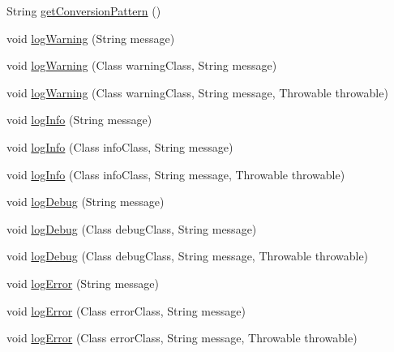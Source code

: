 \begin{DoxyCompactItemize}
\item 
String \mbox{\hyperlink{interfacecom_1_1dlinkddns_1_1atulsaurabh_1_1erpecosystem_1_1logger_1_1_logger_ab9bd1ad5fb48fa4e46fb67fbbe2475f7}{get\+Conversion\+Pattern}} ()
\item 
void \mbox{\hyperlink{interfacecom_1_1dlinkddns_1_1atulsaurabh_1_1erpecosystem_1_1logger_1_1_logger_aab8d04f52fde89ff5e58d84b40e25144}{log\+Warning}} (String message)
\item 
void \mbox{\hyperlink{interfacecom_1_1dlinkddns_1_1atulsaurabh_1_1erpecosystem_1_1logger_1_1_logger_aa5df260afe6fcae92f5a9236b3b6a983}{log\+Warning}} (Class warning\+Class, String message)
\item 
void \mbox{\hyperlink{interfacecom_1_1dlinkddns_1_1atulsaurabh_1_1erpecosystem_1_1logger_1_1_logger_a05aa52bed792e7a4a3519dadaab2f4f3}{log\+Warning}} (Class warning\+Class, String message, Throwable throwable)
\item 
void \mbox{\hyperlink{interfacecom_1_1dlinkddns_1_1atulsaurabh_1_1erpecosystem_1_1logger_1_1_logger_a8671e0fd90d8f2fbb4024d7a73d9070d}{log\+Info}} (String message)
\item 
void \mbox{\hyperlink{interfacecom_1_1dlinkddns_1_1atulsaurabh_1_1erpecosystem_1_1logger_1_1_logger_a37e8723a5243a845e140d2edb6d7f701}{log\+Info}} (Class info\+Class, String message)
\item 
void \mbox{\hyperlink{interfacecom_1_1dlinkddns_1_1atulsaurabh_1_1erpecosystem_1_1logger_1_1_logger_a0a674a1745e0f50d11b1f8be2c4d1726}{log\+Info}} (Class info\+Class, String message, Throwable throwable)
\item 
void \mbox{\hyperlink{interfacecom_1_1dlinkddns_1_1atulsaurabh_1_1erpecosystem_1_1logger_1_1_logger_add9d87ff18f2b432002e2146b67b0f07}{log\+Debug}} (String message)
\item 
void \mbox{\hyperlink{interfacecom_1_1dlinkddns_1_1atulsaurabh_1_1erpecosystem_1_1logger_1_1_logger_a8e94c010b6e08d96550a8ddc4b2f408e}{log\+Debug}} (Class debug\+Class, String message)
\item 
void \mbox{\hyperlink{interfacecom_1_1dlinkddns_1_1atulsaurabh_1_1erpecosystem_1_1logger_1_1_logger_a95b44330997929adfe530e3c845e38f5}{log\+Debug}} (Class debug\+Class, String message, Throwable throwable)
\item 
void \mbox{\hyperlink{interfacecom_1_1dlinkddns_1_1atulsaurabh_1_1erpecosystem_1_1logger_1_1_logger_a0a9d496d0bbbd0afd87f13d38acb88e2}{log\+Error}} (String message)
\item 
void \mbox{\hyperlink{interfacecom_1_1dlinkddns_1_1atulsaurabh_1_1erpecosystem_1_1logger_1_1_logger_a1cf0d549875c44c1afd8cd01dc0af1d6}{log\+Error}} (Class error\+Class, String message)
\item 
void \mbox{\hyperlink{interfacecom_1_1dlinkddns_1_1atulsaurabh_1_1erpecosystem_1_1logger_1_1_logger_a0f7488f980f029dfa98c465877b3fbe6}{log\+Error}} (Class error\+Class, String message, Throwable throwable)
\end{DoxyCompactItemize}


